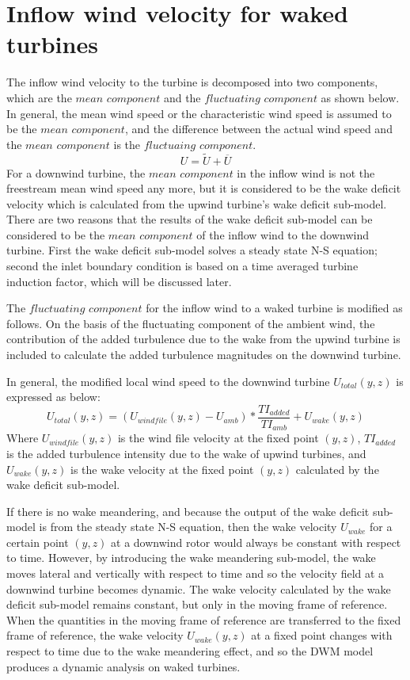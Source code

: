 \documentclass{umthesis}
\begin{document}
\section{Inflow wind velocity for waked turbines}\label{sec:waked_inflow}
The inflow wind velocity to the turbine is decomposed into two components, which are the $mean$ $component$ and the $fluctuating$ $component$ as shown below. In general, the mean wind speed or the characteristic wind speed is assumed to be the $mean$ $component$, and the difference between the actual wind speed and the $mean$ $component$ is the $fluctuaing$ $component$.
\begin{equation}
  U=\widetilde{U}+\overline{U}
\end{equation}
For a downwind turbine, the $mean$ $component$ in the inflow wind is not the freestream mean wind speed any more, but it is considered to be the wake deficit velocity which is calculated from the upwind turbine's wake deficit sub-model. There are two reasons that the results of the wake deficit sub-model can be considered to be the $mean$ $component$ of the inflow wind to the downwind turbine. First the wake deficit sub-model solves a steady state N-S equation; second the inlet boundary condition is based on a time averaged turbine induction factor, which will be discussed later.

The $fluctuating$ $component$ for the inflow wind to a waked turbine is modified as follows. On the basis of the fluctuating component of the ambient wind, the contribution of the added turbulence due to the wake from the upwind turbine is included to calculate the added turbulence magnitudes on the downwind turbine.

In general, the modified local wind speed to the downwind turbine $U_{total}(y,z)$ is expressed as below:
\begin{equation}\label{eq:superimpose}
  U_{total}(y,z)=(U_{windfile}(y,z)-U_{amb})*\frac{TI_{added}}{TI_{amb}}+U_{wake}(y,z)
\end{equation}
Where $U_{windfile}(y,z)$ is the wind file velocity at the fixed point $(y,z)$, $TI_{added}$ is the added turbulence intensity due to the wake of upwind turbines, and $U_{wake}(y,z)$ is the wake velocity at the fixed point $(y,z)$ calculated by the wake deficit sub-model.

If there is no wake meandering, and because the output of the wake deficit sub-model is from the steady state N-S equation, then the wake velocity $U_{wake}$ for a certain point $(y,z)$ at a downwind rotor would always be constant with respect to time. However, by introducing the wake meandering sub-model, the wake moves lateral and vertically with respect to time and so the velocity field at a downwind turbine becomes dynamic. The wake velocity calculated by the wake deficit sub-model remains constant, but only in the moving frame of reference. When the quantities in the moving frame of reference are transferred to the fixed frame of reference, the wake velocity $U_{wake}(y,z)$ at a fixed point changes with respect to time due to the wake meandering effect, and so the DWM model produces a dynamic analysis on waked turbines.
\end{document}
